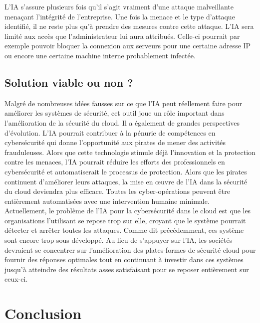 \documentclass[a4paper, 12pt]{article}
\begin{document}
      L’IA s’assure plusieurs fois qu’il s’agit vraiment d’une attaque
      malveillante menaçant l’intégrité de l’entreprise. Une fois la menace et
      le type d’attaque identifié, il ne reste plus qu’à prendre des mesures
      contre cette attaque. L’IA sera limité aux accès que l’administrateur lui
      aura attribués. Celle-ci pourrait par exemple pouvoir bloquer la connexion
      aux serveurs pour une certaine adresse IP ou encore une certaine machine
      interne probablement infectée.

    \subsection{Solution viable ou non ?}
      Malgré de nombreuses idées fausses sur ce que l'IA peut réellement
      faire pour améliorer les systèmes de sécurité, cet outil joue un rôle
      important dans l'amélioration de la sécurité du cloud. Il a également de
      grandes perspectives d’évolution. L’IA pourrait contribuer à la pénurie de
      compétences en cybersécurité qui donne l'opportunité aux pirates de mener
      des activités frauduleuses. Alors que cette technologie stimule déjà
      l'innovation et la protection contre les menaces, l'IA pourrait réduire
      les efforts des professionnels en cybersécurité et automatiserait le
      processus de protection. Alors que les pirates continuent d'améliorer
      leurs attaques, la mise en œuvre de l'IA dans la sécurité du cloud
      deviendra plus efficace. Toutes les cyber-opérations peuvent être
      entièrement automatisées avec une intervention humaine minimale. \\

      Actuellement, le problème de l’IA pour la cybersécurité dans le cloud est
      que les organisations l’utilisant se repose trop sur elle, croyant que le
      système pourrait détecter et arrêter toutes les attaques. Comme dit
      précédemment, ces système sont encore trop sous-développé. Au lieu de
      s'appuyer sur l’IA, les sociétés devraient se concentrer sur
      l'amélioration des plates-formes de sécurité cloud pour fournir des
      réponses optimales tout en continuant à investir dans ces systèmes jusqu’à
      atteindre des résultats asses satisfaisant pour se reposer entièrement sur
      ceux-ci.

  \section{Conclusion}
\end{document}
